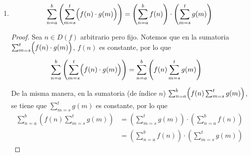 \begin{enumerate}[label=\alph*)]
      
      
  
  \item \[\sum_{n=a}^{b} \left(\sum_{m=s}^{t} \Bigl(f(n) \cdot  g(m)\Bigr)\right) = \left(\sum_{n=a}^{b} f(n)\right)  \cdot \left(\sum_{m=s}^{t} g(m)\right)\]
  
  \begin{proof}\leavevmode
    Sea $n\in D(f)$ arbitrario pero fijo. Notemos que en la sumatoria $\sum_{m=s}^{t} \Bigl(f(n) \cdot  g(m)\Bigr)$, $f(n)$ es constante, por lo que
    \begin{align*}
      \sum_{n=a}^{b} \left(\sum_{m=s}^{t} \Bigl(f(n) \cdot  g(m)\Bigr)\right) &= \sum_{n=a}^{b} \left( f(n) \sum_{m=s}^{t} g(m)\right)
    \end{align*}

    De la misma manera, en la sumatoria (de índice $n$) $\sum_{n=a}^{b} \Bigl( f(n) \sum_{m=s}^{t} g(m)\Bigr)$, se tiene que $\sum_{m=s}^{t} g(m)$ es constante, por lo que
    \begin{align*}
      \sum_{n=a}^{b} \left( f(n) \sum_{m=s}^{t} g(m)\right) &= \left(\sum_{m=s}^{t} g(m)\right) \cdot \left(\sum_{n=a}^{b} f(n)\right)\\
      &= \left(\sum_{n=a}^{b} f(n)\right) \cdot \left(\sum_{m=s}^{t} g(m)\right)
    \end{align*}
  \end{proof}

  

\end{enumerate}
